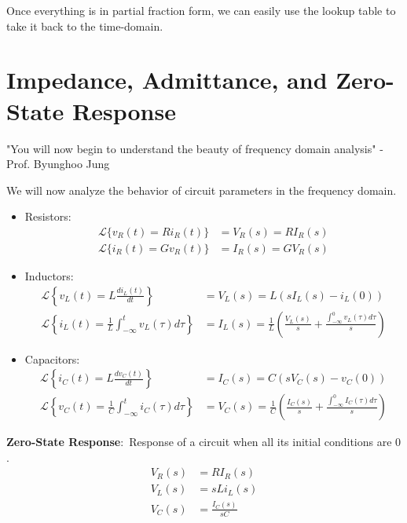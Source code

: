 \documentclass[nobib]{tufte-handout}
\newcommand{\defn}[2]{\noindent\textbf{#1}:\ #2}
\begin{document}
Once everything is in partial fraction form, we can easily use the lookup table to take it back to the time-domain.
\section{Impedance, Admittance, and Zero-State Response}
\begin{center}
    "You will now begin to understand the beauty of frequency domain analysis" - Prof. Byunghoo Jung
\end{center}
We will now analyze the behavior of circuit parameters in the frequency
domain.\\
\begin{itemize}
    \item Resistors:\\
          \begin{align*}
              \mathcal{L}\{v_R(t) = Ri_R(t)\} & = V_R(s) = RI_R(s) \\
              \mathcal{L}\{i_R(t) = Gv_R(t)\} & = I_R(s) = GV_R(s)
          \end{align*}
    \item Inductors:
          \begin{align*}
              \mathcal{L}\left\{ v_L(t) = L\frac{di_L(t)}{dt} \right\}                       & =V_L(s) = L(sI_L(s)-i_L(0))                                                                     \\
              \mathcal{L}\left\{i_L(t) = \frac{1}{L}\int_{-\infty}^{t}v_L(\tau)d\tau\right\} & = I_L(s) = \frac{1}{L}\left( \frac{V_L(s)}{s}+\frac{\int_{-\infty}^{0}v_L(\tau)d\tau}{s}\right)
          \end{align*}
    \item Capacitors:
          \begin{align*}
              \mathcal{L}\left\{ i_C(t) = L\frac{dv_C(t)}{dt} \right\}                       & =I_C(s) = C(sV_C(s)-v_C(0))                                                                     \\
              \mathcal{L}\left\{v_C(t) = \frac{1}{C}\int_{-\infty}^{t}i_C(\tau)d\tau\right\} & = V_C(s) = \frac{1}{C}\left( \frac{I_C(s)}{s}+\frac{\int_{-\infty}^{0}I_C(\tau)d\tau}{s}\right)
          \end{align*}
\end{itemize}
\defn{Zero-State Response}{Response of a circuit when all its initial conditions are $0$.}\\
\begin{align*}
    V_R(s) & = RI_R(s)           \\
    V_L(s) & = sLi_L(s)          \\
    V_C(s) & = \frac{I_C(s)}{sC}
\end{align*}
\end{document}
